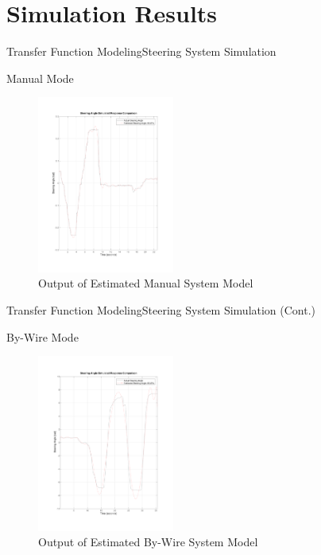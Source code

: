 \documentclass{beamer}
\begin{document}
\section{Simulation Results}

\begin{frame}{Transfer Function Modeling}{Steering System Simulation}
	\begin{block}{Manual Mode}
 		\begin{figure}
		    \centering
		    \includegraphics[width=0.4\textwidth]{figs/img/byWireSteeringTransferFunctionModel}
		    \caption{Output of Estimated Manual System Model}
		        \label{fig:manualSteerModel}
 		\end{figure}
  	\end{block}
\end{frame}

\begin{frame}{Transfer Function Modeling}{Steering System Simulation (Cont.)}
	\begin{block}{By-Wire Mode}
		\begin{figure}
    			\centering
    			\includegraphics[width=0.4\textwidth]{figs/img/manualSteeringTransferFunctionModel}
    			\caption{Output of Estimated By-Wire System Model}
        		\label{fig:byWireSteerModel}
 		\end{figure}
	\end{block}
\end{frame}
\end{document}
